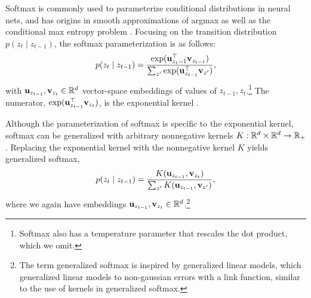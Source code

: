 \documentclass{article}
\begin{document}
Softmax is commonly used to parameterize conditional distributions in
neural nets, and has origins in smooth
approximations of argmax as well as the conditional max entropy problem \citep{}.
Focusing on the transition distribution $p(z_t \mid z_{t-1})$,
the softmax parameterization is as follows: 
\begin{equation*}
p(z_t \mid z_{t-1}) = \frac{\exp(\mathbf{u}_{z_t-1}^\top \mathbf{v}_{z_{t-1}})}
{\sum_{z'} \exp(\mathbf{u}_{z_{t-1}}^\top \mathbf{v}_{z'})},
\end{equation*}
with $\mathbf{u}_{z_{t-1}},\mathbf{v}_{z_t}\in\mathbb{R}^d$ vector-space embeddings of values of
$z_{t-1},z_{t}$.\footnote{
Softmax also has a temperature parameter that rescales 
the dot product, which we omit.
}
The numerator, $\exp(\mathbf{u}_{z_{t-1}}^\top \mathbf{v}_{z_t})$,
is the exponential kernel \citep{rawat2019sampledsoftmax}.

Although the parameterization of softmax is specific to the exponential kernel,
softmax can be generalized with arbitrary nonnegative kernels $K: \mathbb{R}^d\times\mathbb{R}^d\to\mathbb{R}_+$.
Replacing the exponential kernel with the nonnegative kernel $K$ yields 
generalized softmax,
\begin{equation}
\label{eqn:gensoftmax}
p(z_t \mid z_{t-1}) = \frac{K(\mathbf{u}_{z_{t-1}}, \mathbf{v}_{z_t})}{\sum_{z'} K(\mathbf{u}_{z_{t-1}}, \mathbf{v}_{z'})},
\end{equation}
where we again have embeddings $\mathbf{u}_{z_{t-1}},\mathbf{v}_{z_t}\in\mathbb{R}^d$.\footnote{
The term generalized softmax is inspired by generalized linear models,
which generalized linear models to non-gaussian errors with a link function,
similar to the use of kernels in generalized softmax.
}
\end{document}
